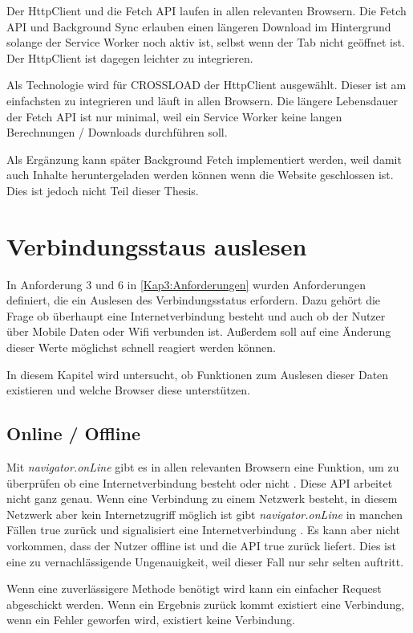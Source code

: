 Der HttpClient und die Fetch \ac{API} laufen in allen relevanten Browsern. Die Fetch \ac{API} und Background Sync erlauben einen längeren Download im Hintergrund solange der Service Worker noch aktiv ist, selbst wenn der Tab nicht geöffnet ist. Der HttpClient ist dagegen leichter zu integrieren.

Als Technologie wird für CROSSLOAD der HttpClient ausgewählt. Dieser ist am einfachsten zu integrieren und läuft in allen Browsern. Die längere Lebensdauer der Fetch \ac{API} ist nur minimal, weil ein Service Worker keine langen Berechnungen / Downloads durchführen soll.

Als Ergänzung kann später Background Fetch implementiert werden, weil damit auch Inhalte heruntergeladen werden können wenn die Website geschlossen ist. Dies ist jedoch nicht Teil dieser Thesis.

\section{Verbindungsstaus auslesen}
In Anforderung 3 und 6 in \autoref{Kap3:Anforderungen} wurden Anforderungen definiert, die ein Auslesen des Verbindungsstatus erfordern. Dazu gehört die Frage ob überhaupt eine Internetverbindung besteht und auch ob der Nutzer über Mobile Daten oder Wifi verbunden ist. Außerdem soll auf eine Änderung dieser Werte möglichst schnell reagiert werden können.

In diesem Kapitel wird untersucht, ob Funktionen zum Auslesen dieser Daten existieren und welche Browser diese unterstützen. 

\subsection{Online / Offline}
Mit \emph{navigator.onLine} gibt es in allen relevanten Browsern \autocite{caniuse-online} eine Funktion, um zu überprüfen ob eine Internetverbindung besteht oder nicht \autocite{Sheppard2017} \autocite{mdn-online}. Diese \ac{API} arbeitet nicht ganz genau. Wenn eine Verbindung zu einem Netzwerk besteht, in diesem Netzwerk aber kein Internetzugriff möglich ist gibt \emph{navigator.onLine} in manchen Fällen true zurück und signalisiert eine Internetverbindung \autocite{Sheppard2017}. Es kann aber nicht vorkommen, dass der Nutzer offline ist und die \ac{API} true zurück liefert. Dies ist eine zu vernachlässigende Ungenauigkeit, weil dieser Fall nur sehr selten auftritt. 

Wenn eine zuverlässigere Methode benötigt wird kann ein einfacher Request abgeschickt werden. Wenn ein Ergebnis zurück kommt existiert eine Verbindung, wenn ein Fehler geworfen wird, existiert keine Verbindung. 

